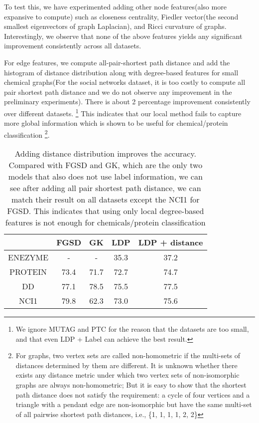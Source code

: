 \documentclass[11pt,onecolumn]{article}
\newcommand{\DOM}       {{LDP}\xspace}
\begin{document}
To test this, we have experimented adding other node features(also more expansive to compute) such as closeness centrality, Fiedler vector(the second smallest eigenvectors of graph Laplacian), and Ricci curvature\cite{lin2011ricci} of graphs. Interestingly, we observe that none of the above features yields any significant improvement consistently across all datasets. 

For edge features, we compute all-pair-shortest path distance and add the histogram of distance distribution along with degree-based features for small chemical graphs(For the social networks dataset, it is too costly to compute all pair shortest path distance and we do not observe any improvement in the preliminary experiments). There is about 2 percentage improvement consistently over different datasets.   \footnote{We ignore MUTAG and PTC for the reason that the datasets are too small, and that even \DOM{} + Label can achieve the best result. } This indicates that our local method fails to capture more global information which is shown to be useful for chemical/protein classification
\footnote{For graphs, two vertex sets are called non-homometric if the multi-sets of distances determined by them are different. It is unknown whether there exists any distance metric under which two vertex sets of non-isomorphic graphs are always non-homometric; But it is easy to show that the shortest path distance does not satisfy the requirement:  a cycle of four vertices and a triangle with a pendant edge are non-isomorphic but have the same multi-set of all pairwise shortest path distances, i.e., \{1, 1, 1, 1, 2, 2\}}. 
\begin{table}[h]
\centering
\begin{tabular}{@{}ccccc@{}}
\toprule
                    & FGSD & GK   & \DOM{}  & \DOM{} + distance \\ \midrule
ENEZYME     & -           &-        & 35.3 & 37.2         \\
PROTEIN     & 73.4    & 71.7 & 72.7 & 74.7         \\
DD              & 77.1    & 78.5  & 75.5    & 77.5         \\
NCI1            & 79.8    &     62.3   & 73.0 & 75.6         \\ \bottomrule
\end{tabular}
\caption{Adding distance distribution improves the accuracy. Compared with FGSD and GK, which are the only two models that also does not use label information, we can see after adding all pair shortest path distance, we can match their result on all datasets except the NCI1 for FGSD. This indicates that using only local degree-based features is not enough for chemicals/protein classification}
\end{table}
\end{document}
